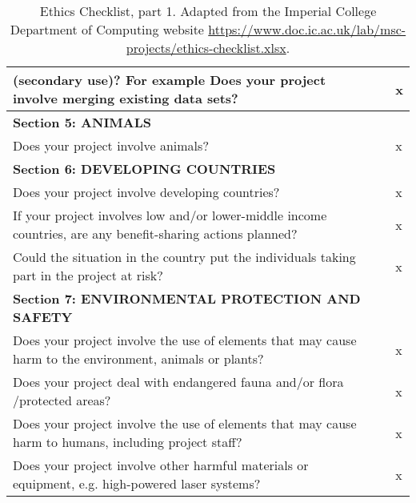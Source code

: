 \documentclass[a4paper,11pt,titlepage]{article}
\begin{document}
\begin{table}[h!]
\begin{tabular}{|p{12.3cm}|l | l |}
        (secondary use)? For example Does your project involve 
        merging existing data sets? &  & x									  \\ \hline
        \cellcolor{green!20}\textbf{Section 5: ANIMALS} &  &  						  \\ \hline
        Does your project involve animals? &  & x 									  \\ \hline
        \cellcolor{green!20}\textbf{Section 6: DEVELOPING COUNTRIES} &  &  			  \\ \hline
        Does your project involve developing countries? &  & x 						  \\ \hline
        If your project involves low and/or lower-middle income countries,
         are any benefit-sharing actions planned? &  & x 							  \\ \hline
        Could the situation in the country put the individuals taking part
         in the project at risk? &  & x 											  \\ \hline
        \cellcolor{green!20}\textbf{Section 7: ENVIRONMENTAL 
        PROTECTION AND SAFETY} &  &  										  \\ \hline
        Does your project involve the use of elements
         that may cause harm to the environment, animals or plants? &  & x 				  \\ \hline
        Does your project deal with endangered fauna and/or flora /protected areas? &  & x 	  \\ \hline
        Does your project involve the use of elements that may cause 
        harm to humans, including project staff? &  & x 								  \\ \hline
        Does your project involve other harmful materials or equipment, 
        e.g. high-powered laser systems? &  & x								 	  \\ \hline
        \end{tabular}
        \caption{Ethics Checklist, part 1. Adapted from the Imperial College Department of Computing website
        \url{https://www.doc.ic.ac.uk/lab/msc-projects/ethics-checklist.xlsx}.}
        \label{tab:ethical_checklist1}
        \end{table}
\end{document}
